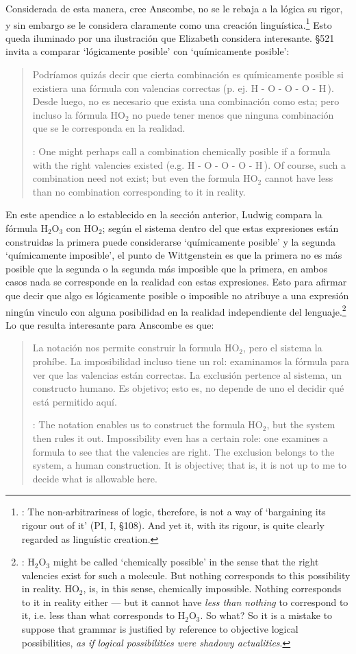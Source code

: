 Considerada de esta manera, cree Anscombe, no se le rebaja a la lógica su rigor, y sin embargo se le considera claramente como una creación linguística.\footnote{\cite[Cf.~][124]{anscombe1981parmenides:qli}: The non-arbitrariness of logic, therefore, is not a way of `bargaining its rigour out of it' (PI, I, \S108). And yet it, with its rigour, is quite clearly regarded as linguístic creation.} Esto queda iluminado por una ilustración que Elizabeth considera interesante. \S521 invita a comparar `lógicamente posible' con `químicamente posible': \blockquote[{\cite[\S520]{wittgenstein1953phiinv}}: One might perhaps call a combination chemically posible if a formula with the right valencies existed (e.g. H - O - O - O - H\,). Of course, such a combination need not exist; but even the formula HO$_2$ cannot have less than no combination corresponding to it in reality.]{Podríamos quizás decir que cierta combinación es químicamente posible si existiera una fórmula con valencias correctas (p. ej. H - O - O - O - H\,). Desde luego, no es necesario que exista una combinación como esta; pero incluso la fórmula HO$_2$ no puede tener menos que ninguna combinación que se le corresponda en la realidad.} En este apendice a lo establecido en la sección anterior, Ludwig compara la fórmula H$_2$O$_3$ con HO$_2$; según el sistema dentro del que estas expresiones están construidas la primera puede considerarse `químicamente posible' y la segunda `químicamente imposible', el punto de Wittgenstein es que la primera no es más posible que la segunda o la segunda más imposible que la primera, en ambos casos nada se corresponde en la realidad con estas expresiones. Esto para afirmar que decir que algo es lógicamente posible o imposible no atribuye a una expresión ningún vinculo con alguna posibilidad en la realidad independiente del lenguaje.\footnote{\cite[Cf.~][219]{hacker2000mind}: H$_2$O$_3$ might be called `chemically possible' in the sense that the right valencies exist for such a molecule. But nothing corresponds to this possibility in reality. HO$_2$, is, in this sense, chemically impossible. Nothing corresponds to it in reality either --- but it cannot have \emph{less than nothing} to correspond to it, i.e. less than what corresponds to H$_2$O$_3$. So what? So it is a mistake to suppose that grammar is justified by reference to objective logical possibilities, \emph{as if logical possibilities were shadowy actualities}.} Lo que resulta interesante para Anscombe es que: \blockquote[{\cite[Cf.~][124]{anscombe1981parmenides:qli}}: The notation enables us to construct the formula HO$_2$, but the system then rules it out. Impossibility even has a certain role: one examines a formula to see that the valencies are right. The exclusion belongs to the system, a human construction. It is objective; that is, it is not up to me to decide what is allowable here.]{La notación nos permite construir la formula HO$_2$, pero el sistema la prohíbe. La imposibilidad incluso tiene un rol: examinamos la fórmula para ver que las valencias están correctas. La exclusión pertence al sistema, un constructo humano. Es objetivo; esto es, no depende de uno el decidir qué está permitido aquí.}

